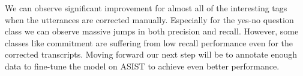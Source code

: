 We can observe significant improvement for almost all of the interesting tags when the
utterances are corrected manually. Especially for the yes-no question class we can 
observe massive jumps in both precision and recall. However, some classes like commitment
are suffering from low recall performance even for the corrected transcripts. Moving forward
our next step will be to annotate enough data to fine-tune the model on ASIST to achieve
even better performance.
